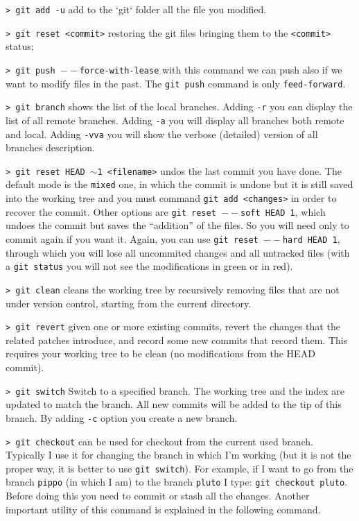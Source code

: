 \documentclass[11pt]{article}
\newcommand{\cmd}[1]{\colorbox{light-gray}{\textcolor{gio}{\texttt{#1}}}}
\begin{document}
\begin{multicols}{2}
\cmd{> git add -u} add to the `git` folder all the file you modified.

\cmd{> git reset <commit>} restoring the git files bringing them to the 
\texttt{<commit>} status;

\cmd{> git push $--$force-with-lease} with this command we can push also if we 
want to modify files in the past. The \texttt{git push} command is only \texttt{feed-forward}.

\cmd{> git branch} shows the list of the local branches. Adding \texttt{-r} you 
can display the list of all remote branches. Adding \texttt{-a} you will display 
all branches both remote and local. Adding \cmd{-vva} you will show the verbose 
(detailed) version of all branches description.  

\cmd{> git reset HEAD $\sim$1 <filename>} undos the last commit you have done. 
The default mode is the \texttt{mixed} one, in which the commit is undone but it 
is still saved into the working tree and you must command \texttt{git add <changes>} 
in order to recover the commit. Other options are \texttt{git reset $--$soft HEAD~1}, 
which undoes the commit but saves the ``addition'' of the files. So you will need 
only to commit again if you want it. Again, you can use \texttt{git reset $--$hard HEAD~1}, 
through which you will lose all uncommited changes and all untracked files 
(with a \texttt{git status} you will not see the modifications in green or in red).

\cmd{> git clean} cleans the working tree by recursively removing files that are 
not under version control, starting from the current directory.

\cmd{> git revert} given one or more existing commits, revert the changes that 
the related patches introduce, and record some new commits that record them. 
This requires your working tree to be clean (no modifications from the HEAD commit).

\cmd{> git switch} Switch to a specified branch. The working tree and the index 
are updated to match the branch. All new commits will be added to the tip of this branch.
By adding \texttt{-c} option you create a new branch.

\cmd{> git checkout} can be used for checkout from the current used branch. Typically
I use it for changing the branch in which I'm working (but it is not the proper
way, it is better to use \texttt{git switch}). For example, if I want to
go from the branch \texttt{pippo} (in which I am) to the branch \texttt{pluto} 
I type: \texttt{git checkout pluto}. Before doing this you need to commit or stash 
all the changes. Another important utility of this command is explained in the
following command.


\end{multicols}
\end{document}

